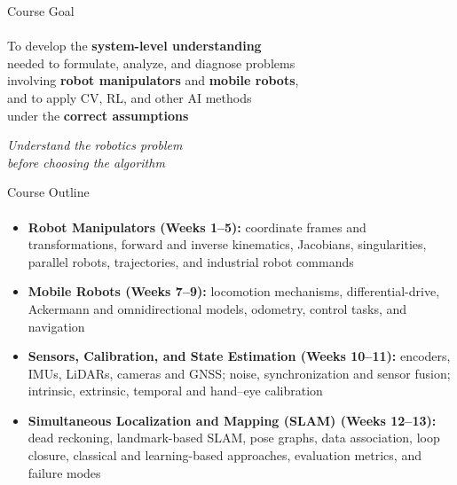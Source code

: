 \documentclass[aspectratio=169]{beamer}
\begin{document}
\begin{frame}[c]{Course Goal}
    \framesubtitle{}
    \centering
    \Large

    To develop the \textbf{system-level understanding} \\[0.4em]
    needed to formulate, analyze, and diagnose problems \\
    involving \textbf{robot manipulators} and
    \textbf{mobile robots}, \\[0.4em]
    and to apply CV, RL, and other AI methods \\
    under the \textbf{correct assumptions}

    \bigskip

    \textit{Understand the robotics problem \\
    before choosing the algorithm}
\end{frame}


\begin{frame}[t]{Course Outline}
    \framesubtitle{}
    \small
    \begin{itemize}
        \item \textbf{Robot Manipulators (Weeks 1--5):}
        coordinate frames and transformations, forward and inverse
        kinematics, Jacobians, singularities, parallel robots,
        trajectories, and industrial robot commands

        \item \textbf{Mobile Robots (Weeks 7--9):}
        locomotion mechanisms, differential-drive, Ackermann and
        omnidirectional models, odometry, control tasks, and navigation

        \item \textbf{Sensors, Calibration, and State Estimation (Weeks 10--11):}
        encoders, IMUs, LiDARs, cameras and GNSS; noise,
        synchronization and sensor fusion; intrinsic, extrinsic,
        temporal and hand--eye calibration

        \item[] \textbf{Simultaneous Localization and Mapping (SLAM) (Weeks 12--13):}
        dead reckoning, landmark-based SLAM, pose graphs,
        data association, loop closure, classical and learning-based
        approaches, evaluation metrics, and failure modes
    \end{itemize}
\end{frame}
\end{document}
